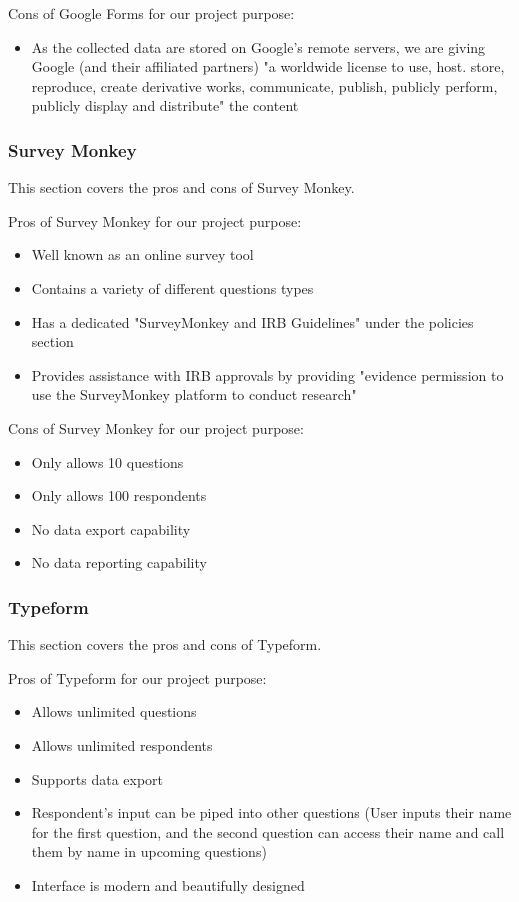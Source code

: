 \documentclass[10pt,journal,compsoc,draftclsnofoot]{IEEEtran}
\begin{document}
Cons of Google Forms for our project purpose:
\begin{itemize}
\item As the collected data are stored on Google's remote servers, we are giving Google (and their affiliated partners) "a worldwide license to use, host. store, reproduce, create derivative works, communicate, publish, publicly perform, publicly display and distribute" the content \cite{google}
\end{itemize}

\subsubsection{Survey Monkey}
This section covers the pros and cons of Survey Monkey.

Pros of Survey Monkey for our project purpose:
\begin{itemize}
\item Well known as an online survey tool
\item Contains a variety of different questions types
\item Has a dedicated "SurveyMonkey and IRB Guidelines" under the policies section
\item Provides assistance with IRB approvals by providing "evidence permission to use the SurveyMonkey platform to conduct research" \cite{surveymonkey}
\end{itemize}

Cons of Survey Monkey for our project purpose:
\begin{itemize}
\item Only allows 10 questions
\item Only allows 100 respondents
\item No data export capability
\item No data reporting capability
\end{itemize}

\subsubsection{Typeform}
This section covers the pros and cons of Typeform.

Pros of Typeform for our project purpose:
\begin{itemize}
\item Allows unlimited questions
\item Allows unlimited respondents
\item Supports data export
\item Respondent's input can be piped into other questions (User inputs their name for the first question, and the second question can access their name and call them by name in upcoming questions)
\item Interface is modern and beautifully designed
\end{itemize}
\end{document}
